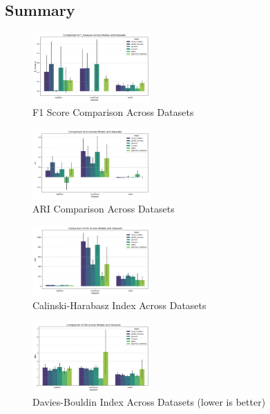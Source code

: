 \subsection{Summary}
\label{subsec:resultssummary}

\begin{figure}[ht!]
    \centering
    \includegraphics[width=0.4\textwidth]{figures/model_comparison_f_measure.png}
    \caption{F1 Score Comparison Across Datasets}
    \label{fig:model_comparison_f_measure}
\end{figure}

\begin{figure}[ht!]
    \centering
    \includegraphics[width=0.4\textwidth]{figures/model_comparison_ari.png}
    \caption{ARI Comparison Across Datasets}
    \label{fig:model_comparison_ari}
\end{figure}

\begin{figure}[ht!]
    \centering
    \includegraphics[width=0.4\textwidth]{figures/model_comparison_chi.png}
    \caption{Calinski-Harabasz Index Across Datasets}
    \label{fig:model_comparison_chi}
\end{figure}

\begin{figure}[htb!]
    \centering
    \includegraphics[width=0.4\textwidth]{figures/model_comparison_dbi.png}
    \caption{Davies-Bouldin Index Across Datasets (lower is better)}
    \label{fig:model_comparison_dbi}
\end{figure}

